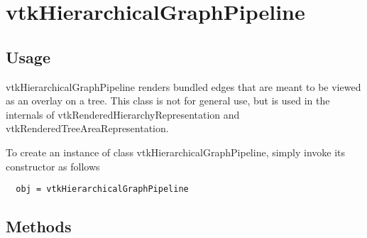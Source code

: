 \section{vtkHierarchicalGraphPipeline}

\subsection{Usage}

 vtkHierarchicalGraphPipeline renders bundled edges that are meant to be
 viewed as an overlay on a tree. This class is not for general use, but
 is used in the internals of vtkRenderedHierarchyRepresentation and
 vtkRenderedTreeAreaRepresentation.

To create an instance of class vtkHierarchicalGraphPipeline, simply
invoke its constructor as follows
\begin{verbatim}
  obj = vtkHierarchicalGraphPipeline
\end{verbatim}
\subsection{Methods}

